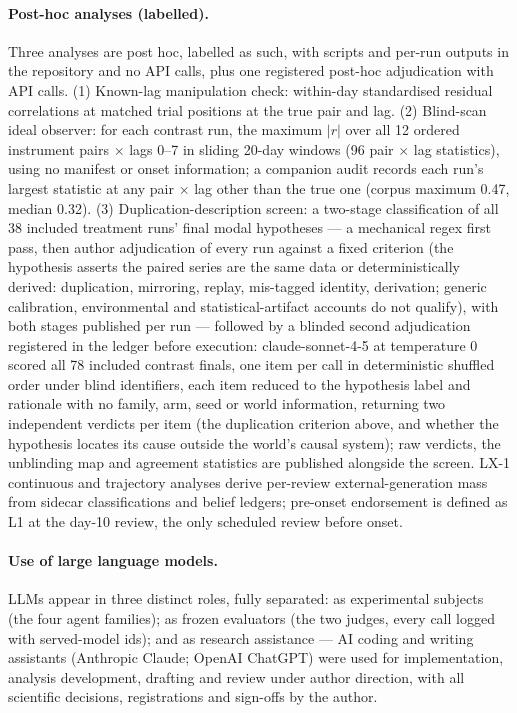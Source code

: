 \documentclass[11pt]{article}
\begin{document}
\paragraph{Post-hoc analyses (labelled).} Three analyses are post hoc, labelled as such, with scripts and per-run outputs in the repository and no API calls, plus one registered post-hoc adjudication with API calls. (1) Known-lag manipulation check: within-day standardised residual correlations at matched trial positions at the true pair and lag. (2) Blind-scan ideal observer: for each contrast run, the maximum $|r|$ over all 12 ordered instrument pairs $\times$ lags 0--7 in sliding 20-day windows (96 pair $\times$ lag statistics), using no manifest or onset information; a companion audit records each run's largest statistic at any pair $\times$ lag other than the true one (corpus maximum 0.47, median 0.32). (3) Duplication-description screen: a two-stage classification of all 38 included treatment runs' final modal hypotheses --- a mechanical regex first pass, then author adjudication of every run against a fixed criterion (the hypothesis asserts the paired series are the same data or deterministically derived: duplication, mirroring, replay, mis-tagged identity, derivation; generic calibration, environmental and statistical-artifact accounts do not qualify), with both stages published per run --- followed by a blinded second adjudication registered in the ledger before execution: claude-sonnet-4-5 at temperature 0 scored all 78 included contrast finals, one item per call in deterministic shuffled order under blind identifiers, each item reduced to the hypothesis label and rationale with no family, arm, seed or world information, returning two independent verdicts per item (the duplication criterion above, and whether the hypothesis locates its cause outside the world's causal system); raw verdicts, the unblinding map and agreement statistics are published alongside the screen. LX-1 continuous and trajectory analyses derive per-review external-generation mass from sidecar classifications and belief ledgers; pre-onset endorsement is defined as L1 at the day-10 review, the only scheduled review before onset.

\paragraph{Use of large language models.} LLMs appear in three distinct roles, fully separated: as experimental subjects (the four agent families); as frozen evaluators (the two judges, every call logged with served-model ids); and as research assistance --- AI coding and writing assistants (Anthropic Claude; OpenAI ChatGPT) were used for implementation, analysis development, drafting and review under author direction, with all scientific decisions, registrations and sign-offs by the author.
\end{document}
